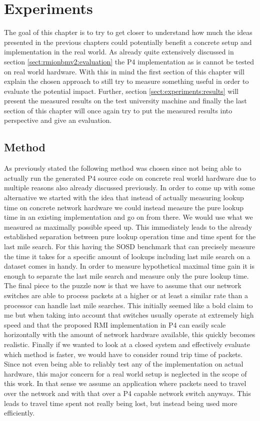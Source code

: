 
\chapter{Experiments}
\label{ch:experiments}
The goal of this chapter is to try to get closer to understand how much the ideas presented in the previous chapters could potentially benefit a concrete setup and implementation in the real world. As already quite extensively discussed in section \ref{sect:rmionbmv2:evaluation} the P4 implementation as is cannot be tested on real world hardware. With this in mind the first section of this chapter will explain the chosen approach to still try to measure something useful in order to evaluate the potential impact. Further, section \ref{sect:experiments:results} will present the measured results on the test university machine and finally the last section of this chapter will once again try to put the measured results into perspective and give an evaluation.

\section{Method}
\label{sect:experiments:methods}
As previously stated the following method was chosen since not being able to actually run the generated P4 source code on concrete real world hardware due to multiple reasons also already discussed previously. In order to come up with some alternative we started with the idea that instead of actually measuring lookup time on concrete network hardware we could instead measure the pure lookup time in an existing implementation and go on from there. We would use what we measured as maximally possible speed up. This immediately leads to the already established separation between pure lookup operation time and time spent for the last mile search. For this having the SOSD benchmark that can precisely measure the time it takes for a specific amount of lookups including last mile search on a dataset comes in handy. In order to measure hypothetical maximal time gain it is enough to separate the last mile search and measure only the pure lookup time. The final piece to the puzzle now is that we have to assume that our network switches are able to process packets at a higher or at least a similar rate than a processor can handle last mile searches. This initially seemed like a bold claim to me but when taking into account that switches usually operate at extremely high speed and that the proposed RMI implementation in P4 can easily scale horizontally with the amount of network hardware available, this quickly becomes realistic. Finally if we wanted to look at a closed system and effectively evaluate which method is faster, we would have to consider round trip time of packets. Since not even being able to reliably test any of the implementation on actual hardware, this major concern for a real world setup is neglected in the scope of this work. In that sense we assume an application where packets need to travel over the network and with that over a P4 capable network switch anyways. This leads to travel time spent not really being lost, but instead being used more efficiently.

